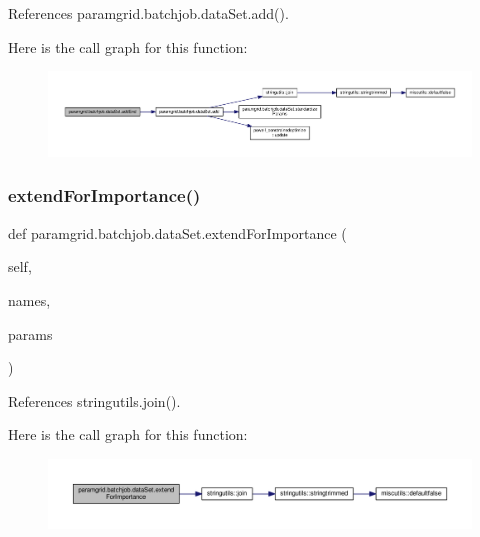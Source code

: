 References paramgrid.\+batchjob.\+data\+Set.\+add().

Here is the call graph for this function\+:
\nopagebreak
\begin{figure}[H]
\begin{center}
\leavevmode
\includegraphics[width=350pt]{classparamgrid_1_1batchjob_1_1dataSet_a2456e07b3b60221a0cf3d9d678ad9e1d_cgraph}
\end{center}
\end{figure}
\mbox{\label{classparamgrid_1_1batchjob_1_1dataSet_ab43197301f2c4016f1445bfe73cae007}} 
\subsubsection{\texorpdfstring{extend\+For\+Importance()}{extendForImportance()}}
{\footnotesize\ttfamily def paramgrid.\+batchjob.\+data\+Set.\+extend\+For\+Importance (\begin{DoxyParamCaption}\item[{}]{self,  }\item[{}]{names,  }\item[{}]{params }\end{DoxyParamCaption})}



References stringutils.\+join().

Here is the call graph for this function\+:
\nopagebreak
\begin{figure}[H]
\begin{center}
\leavevmode
\includegraphics[width=350pt]{classparamgrid_1_1batchjob_1_1dataSet_ab43197301f2c4016f1445bfe73cae007_cgraph}
\end{center}
\end{figure}
\mbox{\label{classparamgrid_1_1batchjob_1_1dataSet_ac2211cc43454541aea7d2b36b1ceb1f4}} 
